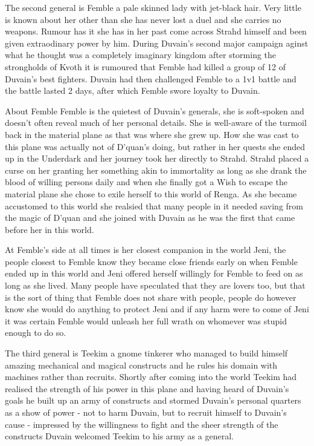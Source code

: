\documentclass[10pt,twoside,twocolumn]{article}
\begin{document}
The second general is Femble a pale skinned lady with jet-black hair. Very little is known about her other than she has never lost a duel and she carries no weapons. Rumour has it she has in her past come across Strahd himself and been given extraodinary power by him. During Duvain's second major campaign aginst what he thought was a completely imaginary kingdom after storming the strongholds of Kvoth it is rumoured that Femble had killed a group of 12 of Duvain's best fighters. Duvain had then challenged Femble to a 1v1 battle and the battle lasted 2 days, after which Femble swore loyalty to Duvain.

\begin{commentbox}{About Femble}
Femble is the quietest of Duvain's generals, she is soft-spoken and doesn't often reveal much of her personal details. She is well-aware of the turmoil back in the material plane as that was where she grew up. How she was cast to this plane was actually not of D'quan's doing, but rather in her quests she ended up in the Underdark and her journey took her directly to Strahd. Strahd placed a curse on her granting her something akin to immortality as long as she drank the blood of willing persons daily and when she finally got a Wish to escape the material plane she chose to exile herself to this world of Renga. As she became accustomed to this world she realsied that many people in it needed saving from the magic of D'quan and she joined with Duvain as he was the first that came before her in this world.

At Femble's side at all times is her closest companion in the world Jeni, the people closest to Femble know they became close friends early on when Femble ended up in this world and Jeni offered herself willingly for Femble to feed on as long as she lived. Many people have speculated that they are lovers too, but that is the sort of thing that Femble does not share with people, people do however know she would do anything to protect Jeni and if any harm were to come of Jeni it was certain Femble would unleash her full wrath on whomever was stupid enough to do so.
\end{commentbox}

The third general is Teekim a gnome tinkerer who managed to build himself amazing mechanical and magical constructs and he rules his domain with machines rather than recruits. Shortly after coming into the world Teekim had realised the strength of his power in this plane and having heard of Duvain's goals he built up an army of constructs and stormed Duvain's personal quarters as a show of power - not to harm Duvain, but to recruit himself to Duvain's cause - impressed by the willingness to fight and the sheer strength of the constructs Duvain welcomed Teekim to his army as a general.
\end{document}
